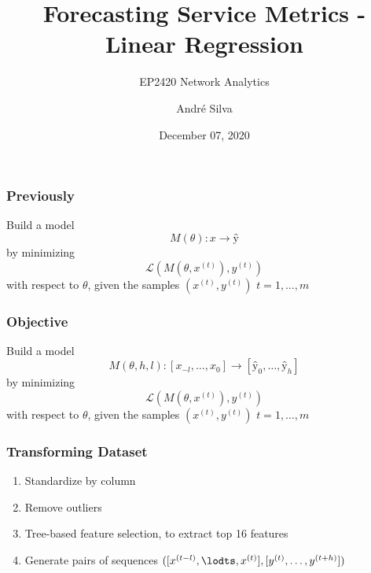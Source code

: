 \documentclass[aspectratio=169]{beamer}
\title{Forecasting Service Metrics - Linear Regression}
\subtitle{EP2420 Network Analytics}
\author{André Silva}
\date{December 07, 2020}
\begin{document}
\begin{frame}
    \titlepage
\end{frame}

\begin{frame}
    \frametitle{Previously}

    \begin{center}
        Build a model 
        \[M({\theta}) : x \rightarrow ŷ\]
        by minimizing
        \[\mathcal{L}({M(\theta,x^{(t)}),y^{(t)}})\]
        with respect to $\theta$, given the samples $(x^{(t)},y^{(t)})$ $t=1,\ldots,m$
    \end{center}
\end{frame}

\begin{frame}
    \frametitle{Objective}

    \begin{center}
        Build a model 
        \[M({\theta,h,l}) : [x_{-l},\ldots,x_{0}] \rightarrow [ŷ_{0},\ldots,ŷ_{h}]\]
        by minimizing
        \[\mathcal{L}({M(\theta,x^{(t)}),y^{(t)}})\]
        with respect to $\theta$, given the samples $(x^{(t)},y^{(t)})$ $t=1,\ldots,m$
    \end{center}
\end{frame}

\begin{frame}
    \frametitle{Transforming Dataset}

    \begin{enumerate}
        \item Standardize by column
        \item Remove outliers
        \item Tree-based feature selection, to extract top 16 features
        \item Generate pairs of sequences $([x^{(t-l)},\lodts,x^{(t)}],[y^{(t)},\ldots,y^{(t+h)}])$
    \end{enumerate}
\end{frame}
\end{document}
